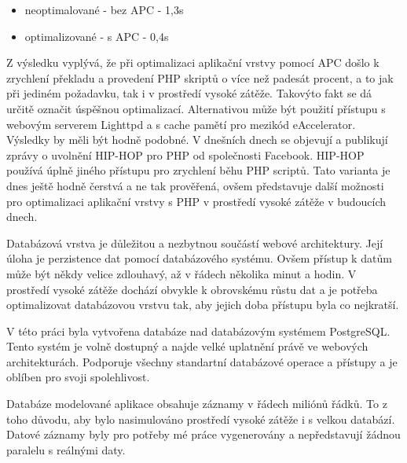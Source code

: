 \documentclass[12pt]{article}
\begin{document}
\begin{itemize}
\item neoptimalované - bez APC - 1,3s
\item optimalizované - s APC - 0,4s
\end{itemize}

Z výsledku vyplývá, že při optimalizaci aplikační vrstvy pomocí APC došlo k zrychlení překladu a provedení PHP skriptů o více než padesát procent, a to jak při jediném požadavku, tak i v prostředí vysoké zátěže. Takovýto fakt se dá určitě označit úspěšnou optimalizací. Alternativou může být použití přístupu s webovým serverem Lighttpd a s cache pamětí pro mezikód eAccelerator. Výsledky by měli být hodně podobné. V dnešních dnech se objevují a publikují zprávy o uvolnění HIP-HOP pro PHP od společnosti Facebook. HIP-HOP používá úplně jiného přístupu pro zrychlení běhu PHP scriptů. Tato varianta je dnes ještě hodně čerstvá a ne tak prověřená, ovšem představuje další možnosti pro optimalizaci aplikační vrstvy s PHP v prostředí vysoké zátěže v budoucích dnech.

\obrazek
{}

\obrazek
{}

\clearpage

\obrazek
{}



Databázová vrstva je důležitou a nezbytnou součástí webové architektury. Její úloha je perzistence dat pomocí databázového systému. Ovšem přístup k datům může být někdy velice zdlouhavý, až v řádech několika minut a hodin. V prostředí vysoké zátěže dochází obvykle k obrovskému růstu dat a je potřeba optimalizovat databázovou vrstvu tak, aby jejich doba přístupu byla co nejkratší.

V této práci byla vytvořena databáze nad databázovým systémem PostgreSQL. Tento systém je volně dostupný a najde velké uplatnění právě ve webových architekturách. Podporuje všechny standartní databázové operace a přístupy a je oblíben pro svoji spolehlivost.

Databáze modelované aplikace obsahuje záznamy v řádech miliónů řádků. To z toho důvodu, aby bylo nasimulováno prostředí vysoké zátěže i s velkou databází. Datové záznamy byly pro potřeby mé práce vygenerovány a nepředstavují žádnou paralelu s reálnými daty.
\end{document}
